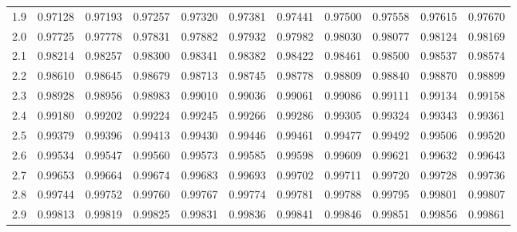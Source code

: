 \begin{tabular}{c|cccccccccc}
1.9&0.97128&0.97193&0.97257&0.97320&0.97381&0.97441&0.97500&0.97558&0.97615&0.97670\\
2.0&0.97725&0.97778&0.97831&0.97882&0.97932&0.97982&0.98030&0.98077&0.98124&0.98169\\
2.1&0.98214&0.98257&0.98300&0.98341&0.98382&0.98422&0.98461&0.98500&0.98537&0.98574\\
2.2&0.98610&0.98645&0.98679&0.98713&0.98745&0.98778&0.98809&0.98840&0.98870&0.98899\\
2.3&0.98928&0.98956&0.98983&0.99010&0.99036&0.99061&0.99086&0.99111&0.99134&0.99158\\
2.4&0.99180&0.99202&0.99224&0.99245&0.99266&0.99286&0.99305&0.99324&0.99343&0.99361\\
2.5&0.99379&0.99396&0.99413&0.99430&0.99446&0.99461&0.99477&0.99492&0.99506&0.99520\\
2.6&0.99534&0.99547&0.99560&0.99573&0.99585&0.99598&0.99609&0.99621&0.99632&0.99643\\
2.7&0.99653&0.99664&0.99674&0.99683&0.99693&0.99702&0.99711&0.99720&0.99728&0.99736\\
2.8&0.99744&0.99752&0.99760&0.99767&0.99774&0.99781&0.99788&0.99795&0.99801&0.99807\\
2.9&0.99813&0.99819&0.99825&0.99831&0.99836&0.99841&0.99846&0.99851&0.99856&0.99861\\

\end{tabular}

